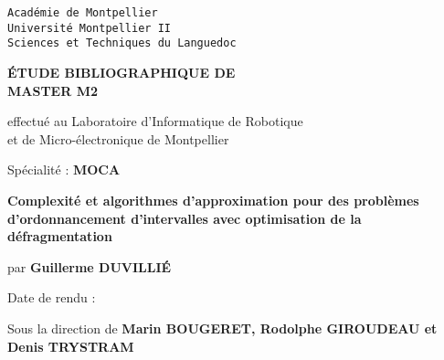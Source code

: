 \pagestyle{fancyplain}
\thispagestyle{empty}
\noindent
\begin{center}
\large{\texttt{Académie de Montpellier}}\\
\Large{\texttt{Université Montpellier II}}\\
\large{\texttt{Sciences et Techniques du Languedoc}}\\
\end{center}

\vspace{1cm}

\begin{center}
\Huge{\textbf{\'{E}TUDE BIBLIOGRAPHIQUE DE\\}}
 \vspace{1.0cm}
\Huge{\textbf{MASTER M2}}
\normalsize
\begin{center}
\vspace{1.0cm}

effectué au Laboratoire d'Informatique de Robotique\\
et de Micro-électronique de Montpellier
\end{center}

\vspace{2mm}

\vspace{0.1cm}
\normalsize

\vspace{3mm}

\large{Spécialité} : \textbf{MOCA}\\
\vspace{1.0cm}

\LARGE{\textbf{Complexité et algorithmes d'approximation pour des problèmes d'ordonnancement d'intervalles
avec optimisation de la défragmentation}}
\vspace{2mm}

\begin{center}
  par \textbf{Guillerme DUVILLIÉ}
\end{center}

\vspace{2mm}



\vspace{4cm}

Date de rendu : \textbf{}

\vspace{0.5cm}

Sous la direction de \textbf{Marin BOUGERET, Rodolphe GIROUDEAU et Denis TRYSTRAM}

\vspace{5mm}




\end{center}
\newpage
\tableofcontents
\newpage

